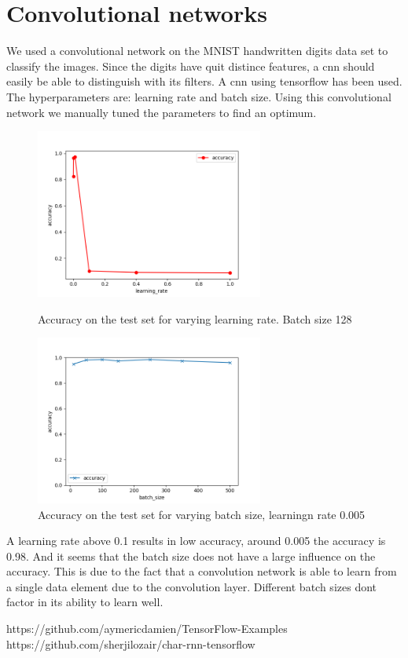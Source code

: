 \documentclass[11pt]{article}
\begin{document}
\section{Convolutional networks}
We used a convolutional network on the MNIST handwritten digits data set to classify the images. Since the digits have quit distince features, a cnn should easily be able to distinguish with its filters. A cnn using tensorflow has been used. The hyperparameters are: learning rate and batch size. Using this convolutional network we manually tuned the parameters to find an optimum. 
\begin{figure}[!h]
\centering
\parbox{6cm}{
\includegraphics[width=7.5cm]{accuracy_lr.png}
\caption{Accuracy on the test set for varying learning rate. Batch size 128}
\label{fig:2figsA}}
\qquad
\begin{minipage}{6cm}
\includegraphics[width=7.5cm]{accuracy_bs.png}
\caption{Accuracy on the test set for varying batch size, learningn rate 0.005}
\label{fig:2figsB}
\end{minipage}
\end{figure}

A learning rate above 0.1 results in low accuracy, around 0.005 the accuracy is 0.98. And it seems that the batch size does not have a large influence on the accuracy. This is due to the fact that a convolution network is able to learn from a single data element due to the convolution layer. Different batch sizes dont factor in its ability to learn well.
\vspace*{\fill}
\begin{thebibliography}{x}
https://github.com/aymericdamien/TensorFlow-Examples
https://github.com/sherjilozair/char-rnn-tensorflow
\end{thebibliography}
\end{document}
